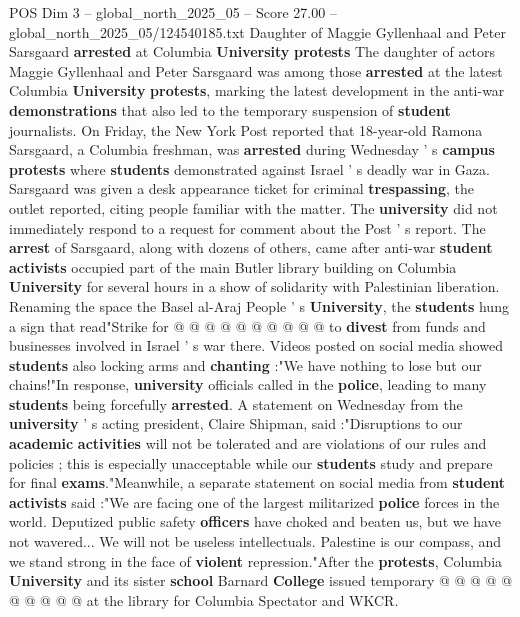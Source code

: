 \begin{textsample}{POS Dim 3 – global\_north\_2025\_05 – Score 27.00 – global\_north\_2025\_05/124540185.txt}  \label{ex:f3_pos_144}
Daughter of Maggie Gyllenhaal and Peter Sarsgaard \textbf{arrested} at Columbia \textbf{University} \textbf{protests} The daughter of actors Maggie Gyllenhaal and Peter Sarsgaard was among those \textbf{arrested} at the latest Columbia \textbf{University} \textbf{protests}, marking the latest development in the anti-war \textbf{demonstrations} that also led to the temporary suspension of \textbf{student} journalists.
On Friday, the New York Post reported that 18-year-old Ramona Sarsgaard, a Columbia freshman, was \textbf{arrested} during Wednesday ' s \textbf{campus} \textbf{protests} where \textbf{students} demonstrated against Israel ' s deadly war in Gaza.
Sarsgaard was given a desk appearance ticket for criminal \textbf{trespassing}, the outlet reported, citing people familiar with the matter.
The \textbf{university} did not immediately respond to a request for comment about the Post ' s report.
The \textbf{arrest} of Sarsgaard, along with dozens of others, came after anti-war \textbf{student} \textbf{activists} occupied part of the main Butler library building on Columbia \textbf{University} for several hours in a show of solidarity with Palestinian liberation.
Renaming the space the Basel al-Araj People ' s \textbf{University}, the \textbf{students} hung a sign that read"Strike for @ @ @ @ @ @ @ @ @ @ to \textbf{divest} from funds and businesses involved in Israel ' s war there.
Videos posted on social media showed \textbf{students} also locking arms and \textbf{chanting} :"We have nothing to lose but our chains!"In response, \textbf{university} officials called in the \textbf{police}, leading to many \textbf{students} being forcefully \textbf{arrested}.
A statement on Wednesday from the \textbf{university} ' s acting president, Claire Shipman, said :"Disruptions to our \textbf{academic} \textbf{activities} will not be tolerated and are violations of our rules and policies ; this is especially unacceptable while our \textbf{students} study and prepare for final \textbf{exams}."Meanwhile, a separate statement on social media from \textbf{student} \textbf{activists} said :"We are facing one of the largest militarized \textbf{police} forces in the world.
Deputized public safety \textbf{officers} have choked and beaten us, but we have not wavered...
We will not be useless intellectuals.
Palestine is our compass, and we stand strong in the face of \textbf{violent} repression."After the \textbf{protests}, Columbia \textbf{University} and its sister \textbf{school} Barnard \textbf{College} issued temporary @ @ @ @ @ @ @ @ @ @ at the library for Columbia Spectator and WKCR.

\end{textsample}
